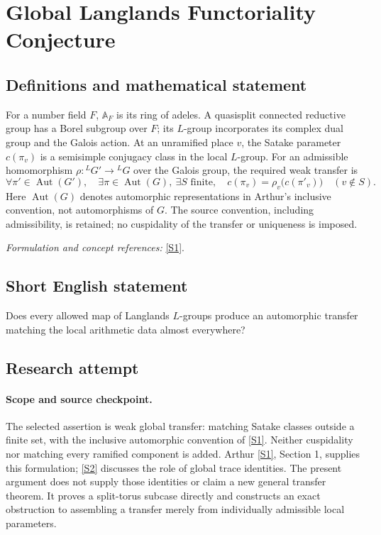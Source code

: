 \documentclass[11pt]{article}
\begin{document}
\section*{\texorpdfstring{Global Langlands Functoriality Conjecture}{Global Langlands Functoriality Conjecture}}\label{7}
\subsection{Definitions and mathematical statement}
For a number field $F$, ${\mathbb{A}}_F$ is its ring of adeles. A quasisplit connected reductive group has a Borel subgroup over $F$; its $L$-group incorporates its complex dual group and the Galois action. At an unramified place $v$, the Satake parameter $c(\pi_v)$ is a semisimple conjugacy class in the local $L$-group. For an admissible homomorphism $\rho:{}^LG'\to{}^LG$ over the Galois group, the required weak transfer is
\[
 \forall\pi'\in\operatorname{Aut}(G'),\quad \exists\pi\in\operatorname{Aut}(G),\ \exists S\text{ finite},\quad
 c(\pi_v)=\rho_v\bigl(c(\pi'_v)\bigr)\quad(v\notin S).
\]
Here $\operatorname{Aut}(G)$ denotes automorphic representations in Arthur's inclusive convention, not automorphisms of $G$. The source convention, including admissibility, is retained; no cuspidality of the transfer or uniqueness is imposed.
\par\smallskip\textit{Formulation and concept references:} \href{https://www.claymath.org/library/cw/arthur/pdf/76.pdf}{[S1]}.

\subsection{Short English statement}
Does every allowed map of Langlands $L$-groups produce an automorphic transfer matching the local arithmetic data almost everywhere?
\subsection{Research attempt}

\paragraph{Scope and source checkpoint.}
The selected assertion is weak global transfer: matching Satake classes
outside a finite set, with the inclusive automorphic convention of \href{https://www.claymath.org/library/cw/arthur/pdf/76.pdf}{[S1]}.
Neither cuspidality nor matching every ramified component is added. Arthur
\href{https://www.claymath.org/library/cw/arthur/pdf/76.pdf}{[S1]}, Section 1, supplies this formulation; \href{https://www.math.toronto.edu/arthur/pdf/arthur-func-and-trace-formula.pdf}{[S2]} discusses the role of
global trace identities. The present argument does not supply those
identities or claim a new general transfer theorem. It proves a split-torus
subcase directly and constructs an exact obstruction to assembling a
transfer merely from individually admissible local parameters.
\end{document}
